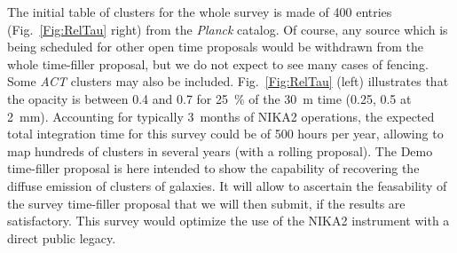 \documentclass[10pt,a4paper,twoside,graphicx,color]{article}
\begin{document}
The initial table of clusters for the whole survey is made of 400
entries (Fig.~\ref{Fig:RelTau} right) from the {\sl Planck}
catalog. Of course, any source which is being scheduled for other open
time proposals would be withdrawn from the whole time-filler proposal,
but we do not expect to see many cases of fencing. Some {\sl ACT}
clusters may also be included.  Fig.~\ref{Fig:RelTau} (left)
illustrates that the opacity is between 0.4 and 0.7 for 25~\% of the
30~m time (0.25, 0.5 at 2~mm). Accounting for typically 3~months of
NIKA2 operations, the expected total integration time for this survey
could be of 500 hours per year, allowing to map hundreds of clusters
in several years (with a rolling proposal). The Demo time-filler
proposal is here intended to show the capability of recovering the
diffuse emission of clusters of galaxies. It will allow to ascertain
the feasability of the survey time-filler proposal that we will then
submit, if the results are satisfactory. This survey would optimize
the use of the NIKA2 instrument with a direct public legacy.\\
\def\aj{AJ}%
\def\actaa{Acta Astron.}%
\def\araa{ARA\&A}%
\def\apj{ApJ}%
\def\apjl{ApJ}%
\def\apjs{ApJS}%
\def\ao{Appl.~Opt.}%
\def\apss{Ap\&SS}%
\def\aap{A\&A}%
\def\aapr{A\&A~Rev.}%
\def\aaps{A\&AS}%
\def\azh{AZh}%
\def\baas{BAAS}%
\def\bac{Bull. astr. Inst. Czechosl.}%
\def\caa{Chinese Astron. Astrophys.}%
\def\cjaa{Chinese J. Astron. Astrophys.}%
\def\icarus{Icarus}%
\def\jcap{J. Cosmology Astropart. Phys.}%
\def\jrasc{JRASC}%
\def\mnras{MNRAS}%
\def\memras{MmRAS}%
\def\na{New A}%
\def\nar{New A Rev.}%
\def\pasa{PASA}%
\end{document}
